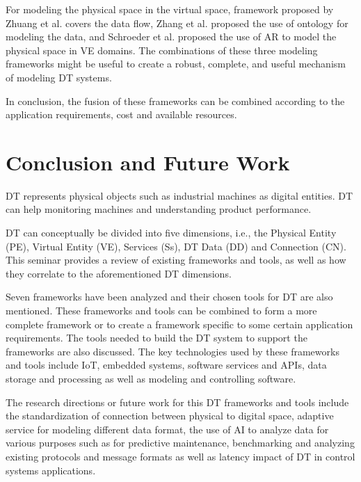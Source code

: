 \documentclass[article,table]{aaltoseries}
\begin{document}
For modeling the physical space in the virtual space, framework proposed by Zhuang et al. \cite{Zhuang2018} covers the data flow, Zhang et al. \cite{Zhang2017} proposed the use of ontology for modeling the data, and Schroeder et al. \cite{schroeder2016visualising} proposed the use of AR to model the physical space in VE domains. The combinations of these three modeling frameworks might be useful to create a robust, complete, and useful mechanism of modeling DT systems.

In conclusion, the fusion of these frameworks can be combined according to the application requirements, cost and available resources. 

\section{Conclusion and Future Work}
DT represents physical objects such as industrial machines as digital entities. DT can help monitoring machines and understanding product performance.

DT can conceptually be divided into five dimensions, i.e., the Physical Entity (PE), Virtual Entity (VE), Services (Ss), DT Data (DD) and Connection (CN). This seminar provides a review of existing frameworks and tools, as well as how they correlate to the aforementioned DT dimensions.

Seven frameworks have been analyzed and their chosen tools for DT are also mentioned. These frameworks and tools can be combined to form a more complete framework or to create a framework specific to some certain application requirements. The tools needed to build the DT system to support the frameworks are also discussed. The key technologies used by these frameworks and tools include IoT, embedded systems, software services and APIs, data storage and processing as well as modeling and controlling software.

The research directions or future work for this DT frameworks and tools include the standardization of connection between physical to digital space, adaptive service for modeling different data format, the use of AI to analyze data for various purposes such as for predictive maintenance, benchmarking and analyzing existing protocols and message formats as well as latency impact of DT in control systems applications.
 




\end{document}
